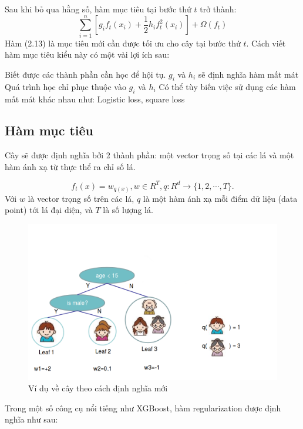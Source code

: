 Sau khi bỏ qua hằng số, hàm mục tiêu tại bước thứ $t$ trở thành:
\begin{equation}
\sum_{i=1}^n [g_i f_t(x_i) + \frac{1}{2} h_i f_t^2(x_i)] + \Omega(f_t)
\end{equation}
Hàm (2.13) là mục tiêu mới cần được tối ưu cho cây tại bước thứ $t$. Cách viết hàm mục tiêu kiểu này có một vài lợi ích sau:
\begin{itemize}
\ii Biết được các thành phần cần học để hội tụ.
\ii $g_i$ và $h_i$ sẽ định nghĩa hàm mất mát
\ii Quá trình học chỉ phục thuộc vào $g_i$ và $h_i$
\ii Có thể tùy biến việc sử dụng các hàm mất mát khác nhau như: Logistic loss, square loss  
\end{itemize}
\subsection{Hàm mục tiêu}
Cây sẽ được định nghĩa bởi 2 thành phần: một vector trọng số tại các lá và một hàm ánh xạ từ thực thể ra chỉ số lá. 

\begin{equation}
f_t(x) = w_{q(x)}, w \in R^T, q:R^d\rightarrow \{1,2,\cdots,T\} .
\end{equation}
Với $w$ là vector trọng số trên các lá, $q$ là một hàm ánh xạ mỗi điểm dữ liệu (data point) tới lá đại diện, và $T$ là số lượng lá. 

\begin{figure}[H]
    \centering
    \includegraphics[scale=0.4]{Chapter2/Figs/refine-definition-tree.png}
    \caption{Ví dụ về cây theo cách định nghĩa mới}
    \label{fig:my_label2}
\end{figure}

Trong một số công cụ nổi tiếng như XGBoost\cite{4}, hàm regularization được định nghĩa như sau:

